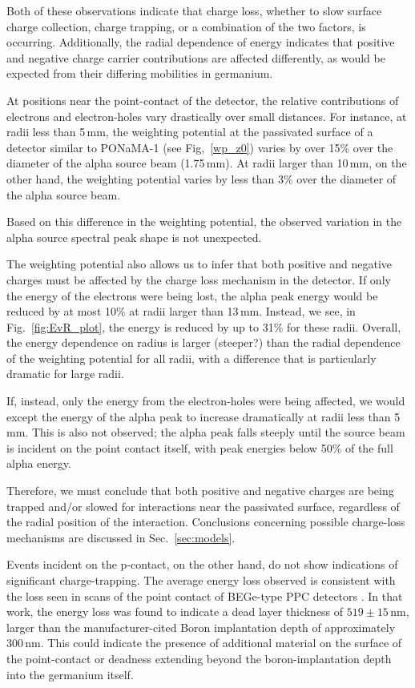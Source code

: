 \documentclass[groupedaddress,rmp,amsmath,amssymb,bibnotes,altaffilletter,twocolumn]{revtex4-1}
\begin{document}
Both of these observations indicate that charge loss, whether to slow surface charge collection, charge trapping, or a combination of the two factors, is occurring. Additionally, the radial dependence of energy indicates that positive and negative charge carrier contributions are affected differently, as would be expected from their differing mobilities in germanium.

At positions near the point-contact of the detector, the relative contributions of electrons and electron-holes vary drastically over small distances. For instance, at radii less than 5\,mm, the weighting potential at the passivated surface of a detector similar to PONaMA-1 (see Fig,~\ref{wp_z0}) varies by over 15\% over the diameter of the alpha source beam (1.75\,mm). At radii larger than 10\,mm, on the other hand, the weighting potential varies by less than 3\% over the diameter of the alpha source beam. 

Based on this difference in the weighting potential, the observed variation in the alpha source spectral peak shape is not unexpected. 

The weighting potential also allows us to infer that both positive and negative charges must be affected by the charge loss mechanism in the detector. If only the energy of the electrons were being lost, the alpha peak energy would be reduced by at most 10\% at radii larger than 13\,mm. Instead, we see, in Fig.~\ref{fig:EvR_plot}, the energy is reduced by up to 31\% for these radii. Overall, the energy dependence on radius is larger (steeper?) than the radial dependence of the weighting potential for all radii, with a difference that is particularly dramatic for large radii. 

If, instead, only the energy from the electron-holes were being affected, we would except the energy of the alpha peak to increase dramatically at radii less than 5\,mm. This is also not observed; the alpha peak falls steeply until the source beam is incident on the point contact itself, with peak energies below 50\% of the full alpha energy. 

Therefore, we must conclude that both positive and negative charges are being trapped and/or slowed for interactions near the passivated surface, regardless of the radial position of the interaction. Conclusions concerning possible charge-loss mechanisms are discussed in Sec.~\ref{sec:models}.

Events incident on the p-contact, on the other hand, do not show indications of significant charge-trapping. The average energy loss observed is consistent with the loss seen in scans of the point contact of BEGe-type PPC detectors \cite{Agostini_thesis}. In that work, the energy loss was found to indicate a dead layer thickness of $519\pm15$\,nm, larger than the manufacturer-cited Boron implantation depth of approximately 300\,nm. This could indicate the presence of additional material on the surface of the point-contact or deadness extending beyond the boron-implantation depth into the germanium itself. 
\end{document}
